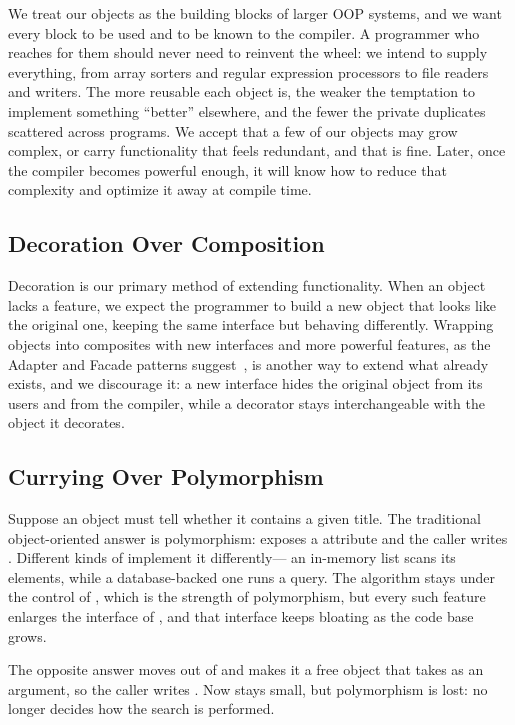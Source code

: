 We treat our objects as the building blocks of larger OOP systems,
  and we want every block to be used and to be known to the \eolang{} compiler.
A programmer who reaches for them should never need to reinvent the wheel:
  we intend to supply everything,
  from array sorters and regular expression processors
  to file readers and writers.
The more reusable each object is, the weaker the temptation
  to implement something ``better'' elsewhere,
  and the fewer the private duplicates scattered across programs.
We accept that a few of our objects may grow complex,
  or carry functionality that feels redundant, and that is fine.
Later, once the \eolang{} compiler becomes powerful enough,
  it will know how to reduce that complexity and optimize it away at compile time.

\subsection{Decoration Over Composition}

Decoration is our primary method of extending functionality.
When an object lacks a feature,
  we expect the programmer to build a new object that looks like the original one,
  keeping the same interface but behaving differently.
Wrapping objects into composites with new interfaces and more powerful features,
  as the Adapter and Facade patterns suggest~\citep{gamma1994design},
  is another way to extend what already exists, and we discourage it:
  a new interface hides the original object from its users and from the compiler,
  while a decorator stays interchangeable with the object it decorates.

\subsection{Currying Over Polymorphism}

Suppose an object  must tell whether it contains a given title.
The traditional object-oriented answer is polymorphism:
   exposes a  attribute
  and the caller writes .
Different kinds of  implement it differently---
  an in-memory list scans its elements,
  while a database-backed one runs a  query.
The algorithm stays under the control of ,
  which is the strength of polymorphism,
  but every such feature enlarges the interface of ,
  and that interface keeps bloating as the code base grows.

The opposite answer moves  out of 
  and makes it a free object that takes  as an argument,
  so the caller writes .
Now  stays small,
  but polymorphism is lost:
   no longer decides how the search is performed.

